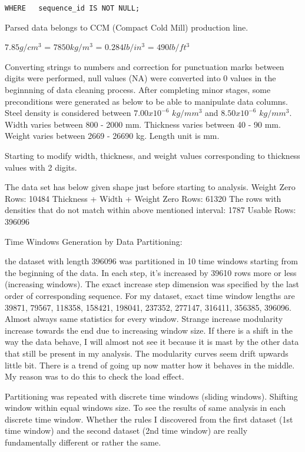 {\begin{lstlisting}
WHERE  	sequence_id IS NOT NULL;
\end{lstlisting}

Parsed data belongs to CCM (Compact Cold Mill) production line.

$7.85 g/cm^{3}$ = $7850 kg/m^{3}$ = $0.284 lb/in^{3}$ = $490 lb/ft^{3}$

Converting strings to numbers and correction for punctuation marks between digits were performed, null values (NA) were converted into $0$ values in the beginnning of data cleaning process. After completing minor stages, some preconditions were generated as below to be able to manipulate data columns.
Steel density is considered between $7.00 x 10^{-6}$ $kg/mm^{3}$ and $8.50x10^{-6}$ $kg/mm^{3}$.
Width varies between 800 - 2000 mm. 
Thickness varies between 40 - 90 mm. 
Weight varies between 2669 - 26690 kg.
Length unit is mm.

Starting to modify width, thickness, and weight values corresponding to thickness values with 2 digits.

The data set has below given shape just before starting to analysis.
Weight Zero Rows: 10484
Thickness + Width + Weight Zero Rows: 61320
The rows with densities that do not match within above mentioned interval: 1787
Usable Rows: 396096

Time Windows Generation by Data Partitioning:

the dataset with length 396096 was partitioned in 10 time windows starting from the beginning of the data. In each step, it's increased by 39610 rows more or less (increasing windows). The exact increase step dimension was specified by the last order of corresponding sequence. For my dataset, exact time window lengths are 39871, 79567, 118358, 158421, 198041, 237352, 277147, 316411, 356385, 396096. Almost always same statistics for every window. Strange increase modularity increase towards the end due to increasing window size. If there is a shift in the way the data behave, I will almost not see it because it is mast by the other data that still be present in my analysis. The modularity curves seem drift upwards little bit. There is a trend of going up now matter how it behaves in the middle. My reason was to do this to check the load effect.

Partitioning was repeated with discrete time windows (sliding windows). Shifting window within equal windows size. To see the results of same analysis in each discrete time window. Whether the rules I discovered from the first dataset (1st time window) and the second dataset (2nd time window) are really fundamentally different or rather the same.

}

